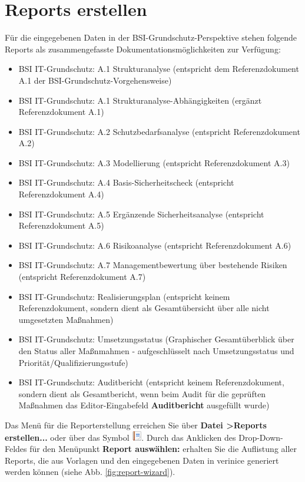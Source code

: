 \documentclass[a4paper,10pt]{book}
\begin{document}
\section{Reports erstellen}
\label{Reports erstellen}
Für die eingegebenen Daten in der BSI-Grundschutz-Perspektive stehen folgende Reports als zusammengefasste Dokumentationsmöglichkeiten zur Verfügung:
\begin{itemize}
 \item BSI IT-Grundschutz: A.1 Strukturanalyse (entspricht dem Referenzdokument A.1 der BSI-Grundschutz-Vorgehensweise)
 \item BSI IT-Grundschutz: A.1 Strukturanalyse-Abhängigkeiten (ergänzt Referenzdokument A.1)
 \item BSI IT-Grundschutz: A.2 Schutzbedarfsanalyse (entspricht Referenzdokument A.2)
 \item BSI IT-Grundschutz: A.3 Modellierung (entspricht Referenzdokument A.3)
 \item BSI IT-Grundschutz: A.4 Basis-Sicherheitscheck (entspricht Referenzdokument A.4)
 \item BSI IT-Grundschutz: A.5 Ergänzende Sicherheitsanalyse (entspricht Referenzdokument A.5)
 \item BSI IT-Grundschutz: A.6 Risikoanalyse (entspricht Referenzdokument A.6)
 \item BSI IT-Grundschutz: A.7 Managementbewertung über bestehende Risiken (entspricht Referenzdokument A.7)
 \item BSI IT-Grundschutz: Realisierungsplan (entspricht keinem Referenzdokument, sondern dient als Gesamtübersicht über alle nicht umgesetzten Maßnahmen)
 \item BSI IT-Grundschutz: Umsetzungsstatus (Graphischer Gesamtüberblick über den Status aller Maßnmahmen - aufgeschlüsselt nach Umsetzungsstatus und Priorität/Qualifizierungsstufe)
 \item BSI IT-Grundschutz: Auditbericht (entspricht keinem Referenzdokument, sondern dient als Gesamtbericht, wenn beim Audit für die geprüften Maßnahmen das Editor-Eingabefeld \textbf{Auditbericht} ausgefüllt wurde)
\end{itemize}

Das Menü für die Reporterstellung erreichen Sie über \textbf{Datei
  \textgreater Reports erstellen...} oder über das Symbol
\includegraphics[height=2ex]{Icon/Report.png}. Durch das Anklicken des
Drop-Down-Feldes für den Menüpunkt \textbf{Report auswählen:} erhalten
Sie die Auflistung aller Reports, die aus Vorlagen und den
eingegebenen Daten in verinice generiert werden können (siehe
Abb. \ref{fig:report-wizard}).
\end{document}

